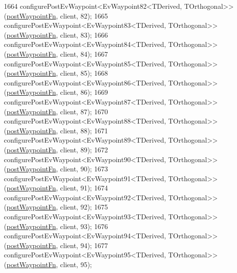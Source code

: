 \begin{DoxyCode}
1664     configurePostEvWaypoint<EvWaypoint82<TDerived, TOrthogonal>>(\hyperlink{classcl__move__base__z_1_1WaypointEventDispatcher_a964a57fcce5d48ec60243230722d8dd7}{postWaypointFn}, client, 82);
1665     configurePostEvWaypoint<EvWaypoint83<TDerived, TOrthogonal>>(\hyperlink{classcl__move__base__z_1_1WaypointEventDispatcher_a964a57fcce5d48ec60243230722d8dd7}{postWaypointFn}, client, 83);
1666     configurePostEvWaypoint<EvWaypoint84<TDerived, TOrthogonal>>(\hyperlink{classcl__move__base__z_1_1WaypointEventDispatcher_a964a57fcce5d48ec60243230722d8dd7}{postWaypointFn}, client, 84);
1667     configurePostEvWaypoint<EvWaypoint85<TDerived, TOrthogonal>>(\hyperlink{classcl__move__base__z_1_1WaypointEventDispatcher_a964a57fcce5d48ec60243230722d8dd7}{postWaypointFn}, client, 85);
1668     configurePostEvWaypoint<EvWaypoint86<TDerived, TOrthogonal>>(\hyperlink{classcl__move__base__z_1_1WaypointEventDispatcher_a964a57fcce5d48ec60243230722d8dd7}{postWaypointFn}, client, 86);
1669     configurePostEvWaypoint<EvWaypoint87<TDerived, TOrthogonal>>(\hyperlink{classcl__move__base__z_1_1WaypointEventDispatcher_a964a57fcce5d48ec60243230722d8dd7}{postWaypointFn}, client, 87);
1670     configurePostEvWaypoint<EvWaypoint88<TDerived, TOrthogonal>>(\hyperlink{classcl__move__base__z_1_1WaypointEventDispatcher_a964a57fcce5d48ec60243230722d8dd7}{postWaypointFn}, client, 88);
1671     configurePostEvWaypoint<EvWaypoint89<TDerived, TOrthogonal>>(\hyperlink{classcl__move__base__z_1_1WaypointEventDispatcher_a964a57fcce5d48ec60243230722d8dd7}{postWaypointFn}, client, 89);
1672     configurePostEvWaypoint<EvWaypoint90<TDerived, TOrthogonal>>(\hyperlink{classcl__move__base__z_1_1WaypointEventDispatcher_a964a57fcce5d48ec60243230722d8dd7}{postWaypointFn}, client, 90);
1673     configurePostEvWaypoint<EvWaypoint91<TDerived, TOrthogonal>>(\hyperlink{classcl__move__base__z_1_1WaypointEventDispatcher_a964a57fcce5d48ec60243230722d8dd7}{postWaypointFn}, client, 91);
1674     configurePostEvWaypoint<EvWaypoint92<TDerived, TOrthogonal>>(\hyperlink{classcl__move__base__z_1_1WaypointEventDispatcher_a964a57fcce5d48ec60243230722d8dd7}{postWaypointFn}, client, 92);
1675     configurePostEvWaypoint<EvWaypoint93<TDerived, TOrthogonal>>(\hyperlink{classcl__move__base__z_1_1WaypointEventDispatcher_a964a57fcce5d48ec60243230722d8dd7}{postWaypointFn}, client, 93);
1676     configurePostEvWaypoint<EvWaypoint94<TDerived, TOrthogonal>>(\hyperlink{classcl__move__base__z_1_1WaypointEventDispatcher_a964a57fcce5d48ec60243230722d8dd7}{postWaypointFn}, client, 94);
1677     configurePostEvWaypoint<EvWaypoint95<TDerived, TOrthogonal>>(\hyperlink{classcl__move__base__z_1_1WaypointEventDispatcher_a964a57fcce5d48ec60243230722d8dd7}{postWaypointFn}, client, 95);

\end{DoxyCode}
